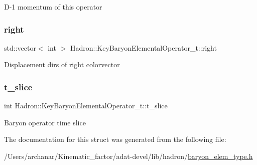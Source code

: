 D-\/1 momentum of this operator \mbox{\label{structHadron_1_1KeyBaryonElementalOperator__t_ac05464b673873344a6ccf42673bf0c1b}} 
\subsubsection{\texorpdfstring{right}{right}}
{\footnotesize\ttfamily std\+::vector$<$ int $>$ Hadron\+::\+Key\+Baryon\+Elemental\+Operator\+\_\+t\+::right}

Displacement dirs of right colorvector \mbox{\label{structHadron_1_1KeyBaryonElementalOperator__t_a5f9b88389c2511c843a8195a7846a558}} 
\subsubsection{\texorpdfstring{t\_slice}{t\_slice}}
{\footnotesize\ttfamily int Hadron\+::\+Key\+Baryon\+Elemental\+Operator\+\_\+t\+::t\+\_\+slice}

Baryon operator time slice 

The documentation for this struct was generated from the following file\+:\begin{DoxyCompactItemize}
\item 
/\+Users/archanar/\+Kinematic\+\_\+factor/adat-\/devel/lib/hadron/\mbox{\hyperlink{adat-devel_2lib_2hadron_2baryon__elem__type_8h}{baryon\+\_\+elem\+\_\+type.\+h}}\end{DoxyCompactItemize}

